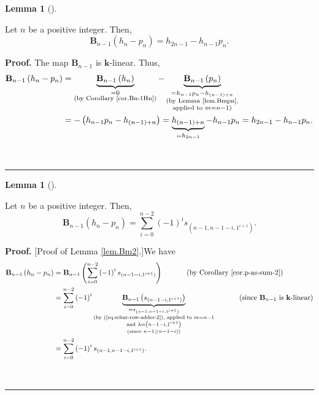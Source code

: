 \documentclass[numbers=enddot,12pt,final,onecolumn,notitlepage]{scrartcl}%
\theoremstyle{definition}
\newtheorem{lem}[theo]{Lemma}
\newenvironment{lemma}[1][]
{\begin{lem}[#1]\begin{leftbar}}
{\end{leftbar}\end{lem}}
\newenvironment{proof}[1][Proof]{\noindent\textbf{#1.} }{\ \rule{0.5em}{0.5em}}
\let\sumnonlimits\sum
\renewcommand{\sum}{\sumnonlimits\limits}
\begin{document}
\begin{lemma}
\label{lem.Bm1}Let $n$ be a positive integer. Then,%
\[
\mathbf{B}_{n-1}\left(  h_{n}-p_{n}\right)  =h_{2n-1}-h_{n-1}p_{n}.
\]

\end{lemma}

\begin{proof}
The map $\mathbf{B}_{n-1}$ is $\mathbf{k}$-linear. Thus,%
\begin{align*}
\mathbf{B}_{n-1}\left(  h_{n}-p_{n}\right)   &  =\underbrace{\mathbf{B}%
_{n-1}\left(  h_{n}\right)  }_{\substack{=0\\\text{(by Corollary
\ref{cor.Bn-1Hn})}}}-\underbrace{\mathbf{B}_{n-1}\left(  p_{n}\right)
}_{\substack{=h_{n-1}p_{n}-h_{\left(  n-1\right)  +n}\\\text{(by Lemma
\ref{lem.Bmpn},}\\\text{applied to }m=n-1\text{)}}}\\
&  =-\left(  h_{n-1}p_{n}-h_{\left(  n-1\right)  +n}\right)
=\underbrace{h_{\left(  n-1\right)  +n}}_{=h_{2n-1}}-h_{n-1}p_{n}%
=h_{2n-1}-h_{n-1}p_{n}.
\end{align*}

\end{proof}

\begin{lemma}
\label{lem.Bm2}Let $n$ be a positive integer. Then,%
\[
\mathbf{B}_{n-1}\left(  h_{n}-p_{n}\right)  =\sum_{i=0}^{n-2}\left(
-1\right)  ^{i}s_{\left(  n-1,n-1-i,1^{i+1}\right)  }.
\]

\end{lemma}

\begin{proof}
[Proof of Lemma \ref{lem.Bm2}.]We have
\begin{align*}
\mathbf{B}_{n-1}\left(  h_{n}-p_{n}\right)   &  =\mathbf{B}_{n-1}\left(
\sum_{i=0}^{n-2}\left(  -1\right)  ^{i}s_{\left(  n-1-i,1^{i+1}\right)
}\right)  \ \ \ \ \ \ \ \ \ \ \left(  \text{by Corollary \ref{cor.p-as-sum-2}%
}\right) \\
&  =\sum_{i=0}^{n-2}\left(  -1\right)  ^{i}\underbrace{\mathbf{B}_{n-1}\left(
s_{\left(  n-1-i,1^{i+1}\right)  }\right)  }_{\substack{=s_{\left(
n-1,n-1-i,1^{i+1}\right)  }\\\text{(by (\ref{eq.schur-row-adder-2}), applied
to }m=n-1\\\text{and }\lambda=\left(  n-1-i,1^{i+1}\right)  \\\text{(since
}n-1\geq n-1-i\text{))}}}\ \ \ \ \ \ \ \ \ \ \left(  \text{since }%
\mathbf{B}_{n-1}\text{ is }\mathbf{k}\text{-linear}\right) \\
&  =\sum_{i=0}^{n-2}\left(  -1\right)  ^{i}s_{\left(  n-1,n-1-i,1^{i+1}%
\right)  }.
\end{align*}

\end{proof}
\end{document}
